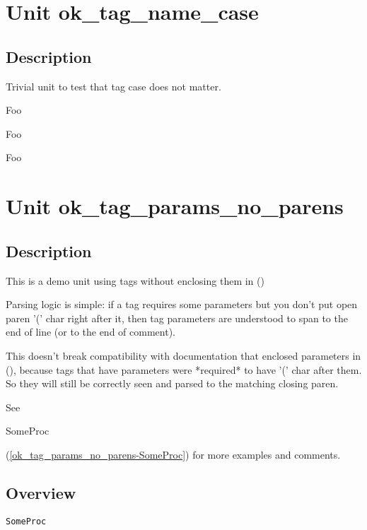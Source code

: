 \documentclass{report}
\begin{document}
\chapter{Unit ok{\_}tag{\_}name{\_}case}
\section{Description}
Trivial unit to test that tag case does not matter.

\begin{ttfamily}Foo\end{ttfamily}

\begin{ttfamily}Foo\end{ttfamily}

\begin{ttfamily}Foo\end{ttfamily}
\chapter{Unit ok{\_}tag{\_}params{\_}no{\_}parens}
\section{Description}
This is a demo unit using tags without enclosing them in ()\hfill\vspace*{1ex}



Parsing logic is simple: if a tag requires some parameters but you don't put open paren '(' char right after it, then tag parameters are understood to span to the end of line (or to the end of comment).

This doesn't break compatibility with documentation that enclosed parameters in (), because tags that have parameters were *required* to have '(' char after them. So they will still be correctly seen and parsed to the matching closing paren.

See \begin{ttfamily}SomeProc\end{ttfamily}(\ref{ok_tag_params_no_parens-SomeProc}) for more examples and comments.

   
\section{Overview}
\begin{description}
\item[\texttt{\begin{ttfamily}EFoo\end{ttfamily} Class}]
\end{description}
\begin{description}
\item[\texttt{SomeProc}]
\end{description}
\end{document}
